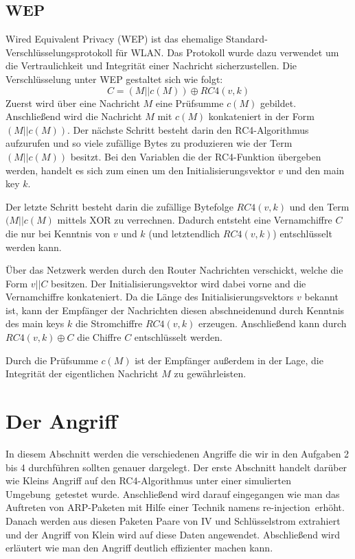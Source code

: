 \documentclass[10pt,a4paper]{article}
\begin{document}
\subsection{WEP}
Wired Equivalent Privacy (WEP) ist das ehemalige Standard-Verschlüsselungsprotokoll für WLAN. Das Protokoll wurde dazu verwendet um die Vertraulichkeit und Integrität einer Nachricht sicherzustellen. Die Verschlüsselung unter WEP gestaltet sich wie folgt:
$$
C = (M || c(M)) \oplus RC4(v,k)
$$
Zuerst wird über eine Nachricht $M$ eine Prüfsumme $c(M)$ gebildet. Anschließend wird die Nachricht $M$ mit $c(M)$ konkateniert in der Form $(M || c(M))$. Der nächste Schritt besteht darin den RC4-Algorithmus aufzurufen und so viele zufällige Bytes zu produzieren wie der Term $(M || c(M))$ besitzt. Bei den Variablen die der RC4-Funktion übergeben werden, handelt es sich zum einen um den Initialisierungsvektor $v$ und den main key $k$.

Der letzte Schritt besteht darin die zufällige Bytefolge $RC4(v,k)$ und den Term $(M || c(M)$ mittels XOR zu verrechnen. Dadurch entsteht eine Vernamchiffre $C$ die nur bei Kenntnis von $v$ und $k$ (und letztendlich $RC4(v,k)$) entschlüsselt werden kann.

Über das Netzwerk werden durch den Router Nachrichten verschickt, welche die Form $v || C$ besitzen. Der Initialisierungsvektor wird dabei vorne and die Vernamchiffre konkateniert. Da die Länge des Initialisierungsvektors $v$ bekannt ist, kann der Empfänger der Nachrichten diesen \glqq abschneiden\grqq und durch Kenntnis des main keys $k$ die Stromchiffre $RC4(v,k)$ erzeugen. Anschließend kann durch $RC4(v,k) \oplus C$ die Chiffre $C$ entschlüsselt werden.

Durch die Prüfsumme $c(M)$ ist der Empfänger außerdem in der Lage, die Integrität der eigentlichen Nachricht $M$ zu gewährleisten. 

\section{Der Angriff}
In diesem Abschnitt werden die verschiedenen Angriffe die wir in den Aufgaben 2 bis 4 durchführen sollten genauer dargelegt. Der erste Abschnitt handelt darüber wie Kleins Angriff auf den RC4-Algorithmus unter einer \glqq simulierten Umgebung\grqq \ getestet wurde. Anschließend wird darauf eingegangen wie man das Auftreten von ARP-Paketen  mit Hilfe einer Technik namens \glqq re-injection\grqq \ erhöht. Danach werden aus diesen Paketen Paare von IV und Schlüsselstrom extrahiert und der Angriff von Klein wird auf diese Daten angewendet. Abschließend wird erläutert wie man den Angriff deutlich effizienter machen kann.
\end{document}

